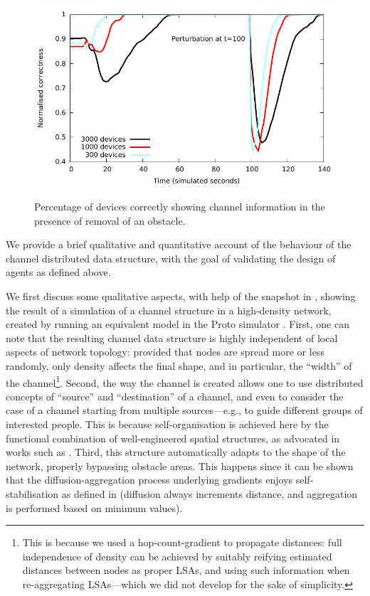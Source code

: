 \documentclass[12pt,a4paper,twoside,openright]{book}
\begin{document}
\begin{figure}
\begin{center}{\includegraphics[width=\textwidth]{img/removeobstacle}}\end{center}
\caption[Devices correctly building the channel, removing an existing obstacle]{Percentage of devices correctly showing channel information in the presence of removal of an obstacle.}
\label{f:london4}
\end{figure}



We provide a brief qualitative and quantitative account of the behaviour of the channel distributed data structure, with the goal of validating the design of agents as defined above.

We first discuss some qualitative aspects, with help of the snapshot in , showing the result of a simulation of a channel structure in a high-density network, created by running an equivalent model in the Proto simulator \cite{proto}.
%
First, one can note that the resulting channel data structure is highly independent of local aspects of network topology: provided that nodes are spread more or less randomly, only density affects the final shape, and in particular, the ``width'' of the channel\footnote{This is because we used a hop-count-gradient to propagate distances: full independence of density can be achieved by suitably reifying estimated distances between nodes as proper LSAs, and using such information when re-aggregating LSAs---which we did not develop for the sake of simplicity.}.
%
Second, the way the channel is created allows one to use distributed concepts of ``source'' and ``destination'' of a channel, and even to consider the case of a channel starting from multiple sources---e.g., to guide different groups of interested people.
%
This is because self-organisation is achieved here by the functional combination of well-engineered spatial structures, as advocated in works such as \cite{SpatialIGI2013}.
%
Third, this structure automatically adapts to the shape of the network, properly bypassing obstacle areas.
%
This happens since it can be shown that the diffusion-aggregation process underlying gradients enjoys self-stabilisation as defined in \cite{VD-COORD2014-LNCS2014} (diffusion always increments distance, and aggregation is performed based on minimum values).
\end{document}

